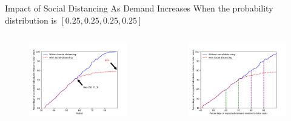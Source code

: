     \begin{frame}{Impact of Social Distancing As Demand Increases}
      \vspace{-0.4cm}
      \scriptsize
      When the probability distribution is $[0.25, 0.25, 0.25, 0.25]$
      \begin{columns}
        \column{6cm}  %
          \begin{figure}[ht]
            \centering
            \includegraphics[width = 1\textwidth]{./images/without7.pdf}
          \end{figure}
          \column{6cm}
          \scriptsize
          \begin{figure}[ht]
            \centering
            \includegraphics[width = 1\textwidth]{./images/without6.pdf}

\end{figure}
\end{columns}
\end{frame}
